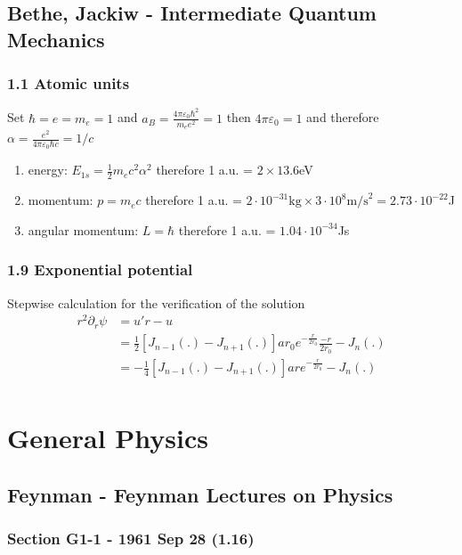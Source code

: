 \documentclass[10pt,a4paper]{article}
\theoremstyle{definition}
\begin{document}
\subsection{{\sc Bethe, Jackiw} - Intermediate Quantum Mechanics}
\subsubsection{1.1 Atomic units}
Set $\hbar=e=m_e=1$ and $a_B=\frac{4\pi\varepsilon_0\hbar^2}{m_ee^2}=1$ then $4\pi\varepsilon_0=1$ and therefore $\alpha=\frac{e^2}{4\pi\varepsilon_0\hbar c}=1/c$
\begin{enumerate}
\item energy: $E_{1s}=\frac{1}{2}m_ec^2\alpha^2$ therefore 1 a.u. = $2\times13.6$eV
\item momentum: $p=m_e c$ therefore 1 a.u. = $2\cdot 10^{-31}\text{kg}\times 3\cdot 10^8\text{m/s}^2=2.73\cdot10^{-22}$J
\item angular momentum: $L=\hbar$ therefore 1 a.u. = $1.04\cdot10^{-34}$Js 
\end{enumerate}

\subsubsection{1.9 Exponential potential}
Stepwise calculation for the verification of the solution
\begin{align}
r^2\partial_r \psi
&=u'r-u\\
&=\frac{1}{2}\left[J_{n-1}(.)-J_{n+1}(.)\right]ar_0e^{-\frac{r}{2r_0}}\frac{-r}{2r_0}-J_n(.)\\
&=-\frac{1}{4}\left[J_{n-1}(.)-J_{n+1}(.)\right]are^{-\frac{r}{2r_0}}-J_n(.)\\
\end{align}

\section{General Physics}

\subsection{{\sc Feynman} - Feynman Lectures on Physics}
\subsubsection{Section G1-1 - 1961 Sep 28 (1.16)}
\end{document}
